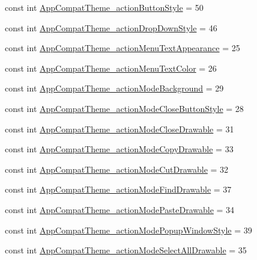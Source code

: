 \begin{CompactItemize}
\item 
const int \hyperlink{class__2doo_1_1_droid_1_1_resource_1_1_styleable_d345c53f41393af74ee7ef75800a9748}{AppCompatTheme\_\-actionButtonStyle} = 50
\item 
const int \hyperlink{class__2doo_1_1_droid_1_1_resource_1_1_styleable_5bbb9f6bfbb99f9e829f8f6cbd9b4990}{AppCompatTheme\_\-actionDropDownStyle} = 46
\item 
const int \hyperlink{class__2doo_1_1_droid_1_1_resource_1_1_styleable_9f7d59914b1784826d7dcee8b00448b5}{AppCompatTheme\_\-actionMenuTextAppearance} = 25
\item 
const int \hyperlink{class__2doo_1_1_droid_1_1_resource_1_1_styleable_cbabc1701c5c8c22d631f212bdde78a3}{AppCompatTheme\_\-actionMenuTextColor} = 26
\item 
const int \hyperlink{class__2doo_1_1_droid_1_1_resource_1_1_styleable_18f5277a2a1080bd1da9d9e39bf5c826}{AppCompatTheme\_\-actionModeBackground} = 29
\item 
const int \hyperlink{class__2doo_1_1_droid_1_1_resource_1_1_styleable_5bafe9b6f4d4e2bf5ee6f1b311f7bf77}{AppCompatTheme\_\-actionModeCloseButtonStyle} = 28
\item 
const int \hyperlink{class__2doo_1_1_droid_1_1_resource_1_1_styleable_0e32daa7d433d29ba4c5fb5015e89690}{AppCompatTheme\_\-actionModeCloseDrawable} = 31
\item 
const int \hyperlink{class__2doo_1_1_droid_1_1_resource_1_1_styleable_831e8598a1a616a1681419f549ed4367}{AppCompatTheme\_\-actionModeCopyDrawable} = 33
\item 
const int \hyperlink{class__2doo_1_1_droid_1_1_resource_1_1_styleable_96981a900c72fbb9c2092aae876d15ac}{AppCompatTheme\_\-actionModeCutDrawable} = 32
\item 
const int \hyperlink{class__2doo_1_1_droid_1_1_resource_1_1_styleable_fc966e4194126e1f88fc28ff9fee1cd4}{AppCompatTheme\_\-actionModeFindDrawable} = 37
\item 
const int \hyperlink{class__2doo_1_1_droid_1_1_resource_1_1_styleable_fb72cdb997173f0638e9a423a815927e}{AppCompatTheme\_\-actionModePasteDrawable} = 34
\item 
const int \hyperlink{class__2doo_1_1_droid_1_1_resource_1_1_styleable_9a366b4b3f478482c5030a6ab7cf2e29}{AppCompatTheme\_\-actionModePopupWindowStyle} = 39
\item 
const int \hyperlink{class__2doo_1_1_droid_1_1_resource_1_1_styleable_c052e9657ffa249a7ec7a0624dddcd25}{AppCompatTheme\_\-actionModeSelectAllDrawable} = 35
\item 

\end{CompactItemize}
